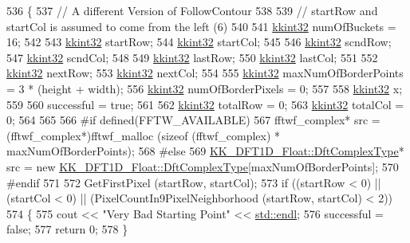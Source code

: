 \begin{DoxyCode}
536 \{
537   \textcolor{comment}{// A different Version of FollowContour}
538 
539   \textcolor{comment}{// startRow and startCol is assumed to come from the left (6)}
540 
541   \hyperlink{namespace_k_k_b_a8fa4952cc84fda1de4bec1fbdd8d5b1b}{kkint32}  numOfBuckets = 16;
542 
543   \hyperlink{namespace_k_k_b_a8fa4952cc84fda1de4bec1fbdd8d5b1b}{kkint32}  startRow;
544   \hyperlink{namespace_k_k_b_a8fa4952cc84fda1de4bec1fbdd8d5b1b}{kkint32}  startCol;
545 
546   \hyperlink{namespace_k_k_b_a8fa4952cc84fda1de4bec1fbdd8d5b1b}{kkint32}  scndRow;
547   \hyperlink{namespace_k_k_b_a8fa4952cc84fda1de4bec1fbdd8d5b1b}{kkint32}  scndCol;
548 
549   \hyperlink{namespace_k_k_b_a8fa4952cc84fda1de4bec1fbdd8d5b1b}{kkint32}  lastRow;
550   \hyperlink{namespace_k_k_b_a8fa4952cc84fda1de4bec1fbdd8d5b1b}{kkint32}  lastCol;
551 
552   \hyperlink{namespace_k_k_b_a8fa4952cc84fda1de4bec1fbdd8d5b1b}{kkint32}  nextRow;
553   \hyperlink{namespace_k_k_b_a8fa4952cc84fda1de4bec1fbdd8d5b1b}{kkint32}  nextCol;
554 
555   \hyperlink{namespace_k_k_b_a8fa4952cc84fda1de4bec1fbdd8d5b1b}{kkint32}  maxNumOfBorderPoints = 3 * (height + width);
556   \hyperlink{namespace_k_k_b_a8fa4952cc84fda1de4bec1fbdd8d5b1b}{kkint32}  numOfBorderPixels = 0;
557 
558   \hyperlink{namespace_k_k_b_a8fa4952cc84fda1de4bec1fbdd8d5b1b}{kkint32} x;
559 
560   successful = \textcolor{keyword}{true};
561 
562   \hyperlink{namespace_k_k_b_a8fa4952cc84fda1de4bec1fbdd8d5b1b}{kkint32}  totalRow = 0;
563   \hyperlink{namespace_k_k_b_a8fa4952cc84fda1de4bec1fbdd8d5b1b}{kkint32}  totalCol = 0;
564 
565 
566 \textcolor{preprocessor}{  #if  defined(FFTW\_AVAILABLE)}
567   fftwf\_complex*  src = (fftwf\_complex*)fftwf\_malloc (\textcolor{keyword}{sizeof} (fftwf\_complex) * maxNumOfBorderPoints);
568 \textcolor{preprocessor}{  #else}
569   \hyperlink{class_k_k_b_1_1_k_k___d_f_t1_d_a4cbc827157dd30ddec2d3753e552a827}{KK\_DFT1D\_Float::DftComplexType}*  src = \textcolor{keyword}{new} 
      \hyperlink{class_k_k_b_1_1_k_k___d_f_t1_d_a4cbc827157dd30ddec2d3753e552a827}{KK\_DFT1D\_Float::DftComplexType}[maxNumOfBorderPoints];
570 \textcolor{preprocessor}{  #endif}
571 
572   GetFirstPixel (startRow, startCol);
573   \textcolor{keywordflow}{if}  ((startRow < 0)  ||  (startCol < 0)  ||  (PixelCountIn9PixelNeighborhood (startRow, startCol) < 2))
574   \{
575     cout << \textcolor{stringliteral}{"Very Bad Starting Point"} << \hyperlink{namespace_k_k_b_ad1f50f65af6adc8fa9e6f62d007818a8}{std::endl};
576     successful = \textcolor{keyword}{false};
577     \textcolor{keywordflow}{return} 0;
578   \}

\end{DoxyCode}
